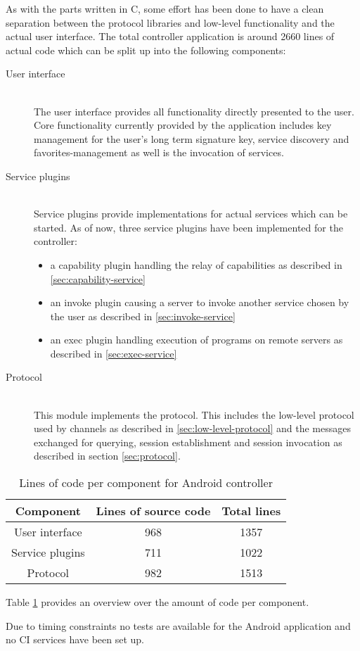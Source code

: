 As with the parts written in C, some effort has been done to have a clean separation between the protocol libraries and low-level functionality and the actual user interface.
The total controller application is around 2660 lines of actual code which can be split up into the following components:
\begin{description}
    \item[User interface]\hfill\\
        The user interface provides all functionality directly presented to the user.
        Core functionality currently provided by the application includes key management for the user's long term signature key, service discovery and favorites-management as well is the invocation of services.
    \item[Service plugins]\hfill\\
        Service plugins provide implementations for actual services which can be started.
        As of now, three service plugins have been implemented for the controller:
        \begin{itemize}
            \item a capability plugin handling the relay of capabilities as described in \ref{sec:capability-service}
            \item an invoke plugin causing a server to invoke another service chosen by the user as described in \ref{sec:invoke-service}
            \item an exec plugin handling execution of programs on remote servers as described in \ref{sec:exec-service}
        \end{itemize}
    \item[Protocol]\hfill\\
        This module implements the protocol.
        This includes the low-level protocol used by channels as described in \ref{sec:low-level-protocol} and the messages exchanged for querying, session establishment and session invocation as described in section \ref{sec:protocol}.
\end{description}

\begin{table}
    \centering
    \begin{tabular}{|c|c|c|}
        \hline
        \bfseries Component & \bfseries Lines of source code & \bfseries Total lines\\
        \hline
        User interface & 968 & 1357\\
        \hline
        Service plugins & 711 & 1022\\
        \hline
        Protocol & 982 & 1513\\
        \hline
    \end{tabular}
    \caption{Lines of code per component for Android controller}
    \label{tab:sloc-controller}
\end{table}

Table \ref{tab:sloc-controller} provides an overview over the amount of code per component.

Due to timing constraints no tests are available for the Android application and no CI services have been set up.

